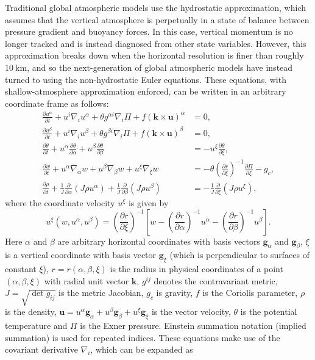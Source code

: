 \documentclass[gmdd, hvmath, online]{copernicus_discussions}
\newcommand{\vb}{\mathbf}
\newcommand{\pdiff}[2]{\frac{\partial #1}{\partial #2}}
\begin{document}
Traditional global atmospheric models use the hydrostatic approximation, which assumes that the vertical atmosphere is perpetually in a state of balance between pressure gradient and buoyancy forces.  In this case, vertical momentum is no longer tracked and is instead diagnosed from other state variables.  However, this approximation breaks down when the horizontal resolution is finer than roughly $10\ \mbox{km}$, and so the next-generation of global atmospheric models have instead turned to using the non-hydrostatic Euler equations.  These equations, with shallow-atmosphere approximation enforced, can be written in an arbitrary coordinate frame as follows:
\begin{align}
\label{eq:NonhydroEqn1} \pdiff{u^\alpha}{t} + u^i \nabla_i u^\alpha + \theta g^{\alpha i} \nabla_i \Pi + f (\vb{k} \times \vb{u})^\alpha &= 0, \\
\label{eq:NonhydroEqn2} \pdiff{u^\beta}{t} + u^i \nabla_i u^\beta + \theta g^{\beta i} \nabla_i \Pi + f (\vb{k} \times \vb{u})^\beta &= 0, \\
\label{eq:NonhydroEqn3} \pdiff{\theta}{t} + u^\alpha \pdiff{\theta}{\alpha} + u^\beta \pdiff{\theta}{\beta} &= - u^\xi \pdiff{\theta}{\xi}, \\
\label{eq:NonhydroEqn4} \pdiff{w}{t} + u^\alpha \nabla_\alpha w + u^\beta \nabla_\beta w + u^\xi \nabla_\xi w &= - \theta \left( \pdiff{r}{\xi} \right)^{-1} \pdiff{\Pi}{\xi} - g_c, \\
\label{eq:NonhydroEqn5} \pdiff{\rho}{t} + \frac{1}{J} \pdiff{}{\alpha} (J \rho u^\alpha) + \frac{1}{J} \pdiff{}{\beta} (J \rho u^\beta) &= - \frac{1}{J} \pdiff{}{\xi} (J \rho u^\xi),
\end{align} where the coordinate velocity $u^\xi$ is given by
\begin{equation} \label{eq:NonhydroCoordinateVelocity}
u^\xi(w, u^\alpha, u^\beta) = \left( \pdiff{r}{\xi} \right)^{-1} \left[w - \left( \pdiff{r}{\alpha} \right)^{-1} u^\alpha - \left( \pdiff{r}{\beta} \right)^{-1} u^\beta \right].
\end{equation}  Here $\alpha$ and $\beta$ are arbitrary horizontal coordinates with basis vectors $\vb{g}_\alpha$ and $\vb{g}_\beta$, $\xi$ is a vertical coordinate with basis vector $\vb{g}_\xi$ (which is perpendicular to surfaces of constant $\xi$), $r = r(\alpha, \beta, \xi)$ is the radius in physical coordinates of a point $(\alpha, \beta, \xi)$ with radial unit vector $\vb{k}$, $g^{ij}$ denotes the contravariant metric, $J = \sqrt{\det g_{ij}}$ is the metric Jacobian, $g_c$ is gravity, $f$ is the Coriolis parameter, $\rho$ is the density, $\vb{u} = u^\alpha \vb{g}_\alpha + u^\beta \vb{g}_\beta + u^\xi \vb{g}_\xi$ is the vector velocity, $\theta$ is the potential temperature and $\Pi$ is the Exner pressure.  Einstein summation notation (implied summation) is used for repeated indices.  These equations make use of the covariant derivative $\nabla_i$, which can be expanded as
\end{document}
